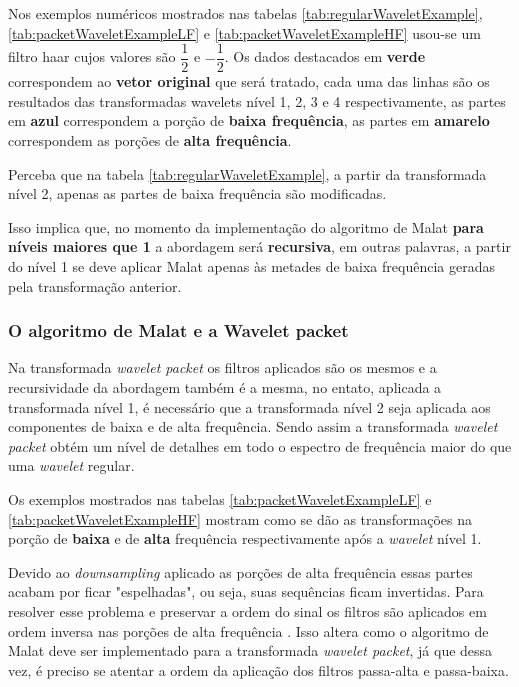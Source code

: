 			\par Nos exemplos numéricos mostrados nas tabelas \ref{tab:regularWaveletExample}, \ref{tab:packetWaveletExampleLF} e \ref{tab:packetWaveletExampleHF} usou-se um filtro haar cujos valores são $\dfrac{1}{2}$ e $-\dfrac{1}{2}$. Os dados destacados em \textbf{verde} correspondem ao \textbf{vetor original} que será tratado, cada uma das linhas são os resultados das transformadas wavelets nível 1, 2, 3 e 4 respectivamente, as partes em \textbf{azul} correspondem a porção de \textbf{baixa frequência}, as partes em \textbf{amarelo} correspondem as porções de \textbf{alta frequência}.
			
			\par Perceba que na tabela \ref{tab:regularWaveletExample}, a partir da transformada nível 2, apenas as partes de baixa frequência são modificadas.
			
			\par Isso implica que, no momento da implementação do algoritmo de Malat \textbf{para níveis maiores que 1} a abordagem será \textbf{recursiva}, em outras palavras, a partir do nível 1 se deve aplicar Malat apenas às metades de baixa frequência geradas pela transformação anterior.
			
			

		\subsubsection{O algoritmo de Malat e a Wavelet packet}
			\par Na transformada \textit{wavelet packet} os filtros aplicados são os mesmos e a recursividade da abordagem também é a mesma, no entato, aplicada a transformada nível 1, é necessário que a transformada nível 2 seja aplicada aos componentes de baixa e de alta frequência. Sendo assim a transformada \textit{wavelet packet} obtém um nível de detalhes em todo o espectro de frequência maior do que uma \textit{wavelet} regular. 
			
			\par Os exemplos mostrados nas tabelas \ref{tab:packetWaveletExampleLF} e \ref{tab:packetWaveletExampleHF} mostram como se dão as transformações na porção de \textbf{baixa} e de \textbf{alta} frequência respectivamente após a \textit{wavelet} nível 1.

			\par Devido ao \textit{downsampling} aplicado as porções de alta frequência essas partes acabam por ficar "espelhadas", ou seja, suas sequências ficam invertidas. Para resolver  esse problema e preservar a ordem do sinal os filtros são aplicados em ordem inversa nas porções de alta frequência \cite{Jensen_2001}. Isso altera como o algoritmo de Malat deve ser implementado para a transformada \textit{wavelet packet}, já que dessa vez, é preciso se atentar a ordem da aplicação dos filtros passa-alta e passa-baixa.

